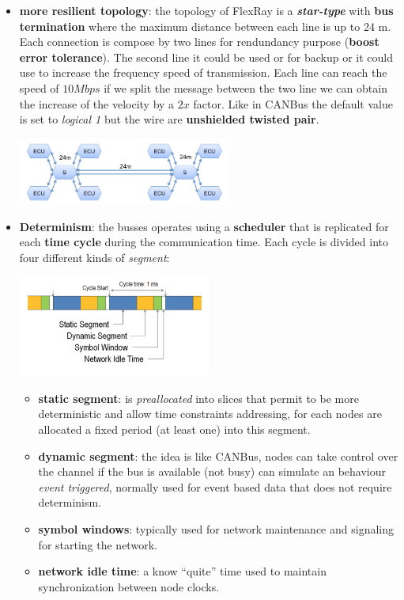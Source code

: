 \begin{itemize}[nosep]
    
    \item \textbf{more resilient topology}: the topology of FlexRay is a \textbf{\textit{star-type}} with \textbf{bus termination} where the maximum distance between each line is up to 24 m. Each connection is compose by two lines for rendundancy purpose (\textbf{boost error tolerance}). The second line it could be used or for backup or it could use to increase the frequency speed of transmission. Each line can reach the speed of $10Mbps$ if we split the message between the two line we can obtain the increase of the velocity by a $2x$ factor. Like in CANBus the default value is set to \textit{logical 1} but the wire are \textbf{unshielded twisted pair}.
    \begin{center}
        \includegraphics[width=0.55\textwidth]{img/top_flexray}
    \end{center}

    \item \textbf{Determinism}: the busses operates using a \textbf{scheduler} that is replicated for each \textbf{time cycle} during the communication time. Each cycle is divided into four different kinds of \textit{segment}:
    \begin{center}
        \includegraphics[width=0.5\textwidth]{img/flexray_cycle}
    \end{center}
    \begin{itemize}[nosep]
        \item \textbf{static segment}: is \textit{preallocated} into slices that permit to be more deterministic and allow time constraints addressing, for each nodes are allocated a fixed period (at least one) into this segment.
        \item \textbf{dynamic segment}: the idea is like CANBus, nodes can take control over the channel if the bus is available (not busy) can simulate an behaviour \textit{event triggered}, normally used for event based data that does not require determinism.
        \item \textbf{symbol windows}: typically used for network maintenance and signaling for starting the network.
        \item \textbf{network idle time}: a know ``quite'' time used to maintain synchronization between node clocks. 
    \end{itemize}


\end{itemize}

